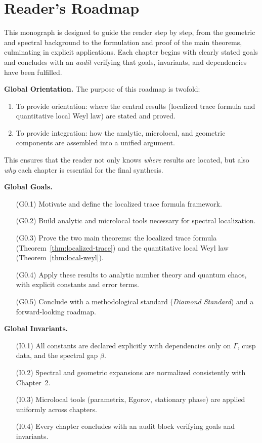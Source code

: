\section{Reader's Roadmap}

This monograph is designed to guide the reader step by step,
from the geometric and spectral background to the formulation
and proof of the main theorems, culminating in explicit applications.
Each chapter begins with clearly stated goals and concludes
with an \emph{audit} verifying that goals, invariants, and
dependencies have been fulfilled.

\medskip

\noindent\textbf{Global Orientation.}
The purpose of this roadmap is twofold:
\begin{enumerate}
  \item To provide orientation: where the central results
  (localized trace formula and quantitative local Weyl law)
  are stated and proved.
  \item To provide integration: how the analytic, microlocal,
  and geometric components are assembled into a unified argument.
\end{enumerate}
This ensures that the reader not only knows \emph{where}
results are located, but also \emph{why} each chapter is essential
for the final synthesis.

\medskip

\noindent\textbf{Global Goals.}
\begin{itemize}
  \item[(G0.1)] Motivate and define the localized trace formula framework.
  \item[(G0.2)] Build analytic and microlocal tools necessary
  for spectral localization.
  \item[(G0.3)] Prove the two main theorems:
  the localized trace formula (Theorem~\ref{thm:localized-trace})
  and the quantitative local Weyl law (Theorem~\ref{thm:local-weyl}).
  \item[(G0.4)] Apply these results to analytic number theory
  and quantum chaos, with explicit constants and error terms.
  \item[(G0.5)] Conclude with a methodological standard
  (\emph{Diamond Standard}) and a forward-looking roadmap.
\end{itemize}

\medskip

\noindent\textbf{Global Invariants.}
\begin{itemize}
  \item[(I0.1)] All constants are declared explicitly with dependencies
  only on $\Gamma$, cusp data, and the spectral gap $\beta$.
  \item[(I0.2)] Spectral and geometric expansions are normalized consistently
  with Chapter~2.
  \item[(I0.3)] Microlocal tools (parametrix, Egorov, stationary phase)
  are applied uniformly across chapters.
  \item[(I0.4)] Every chapter concludes with an audit block
  verifying goals and invariants.
\end{itemize}

